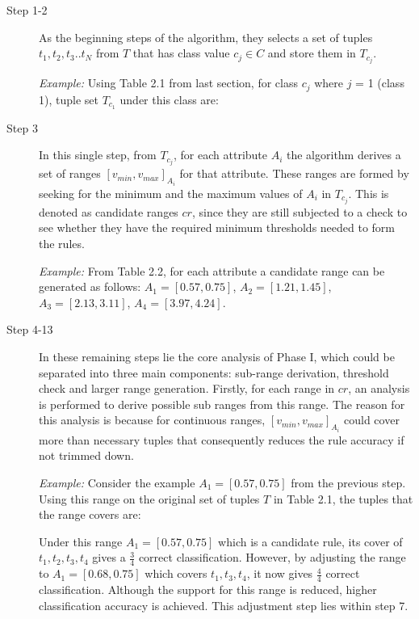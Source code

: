 \begin{description}
\item[Step 1-2] As the beginning steps of the algorithm, they selects a set of tuples $t_1, t_2, t_3..t_N$ from $T$ that has class value $c_j \in C$ and store them in $T_{c_j}$. 

\textit{Example: } Using Table 2.1 from last section, for class $c_j$ where $j$ = 1 (class 1), tuple set $T_{c_1}$ under this class are: 

 

\item[Step 3] In this single step, from $T_{c_j}$, for each attribute $A_i$ the algorithm derives a set of ranges $[v_{min}, v_{max}]_{A_i}$ for that attribute. These ranges are formed by seeking for the minimum and the maximum values of $A_i$ in $T_{c_j}$. This is denoted as candidate ranges $cr$, since they are still subjected to a check to see whether they have the required minimum thresholds needed to form the rules. 

\textit{Example: } From Table 2.2, for each attribute a candidate range can be generated as follows: 
$A_1 = [0.57, 0.75]$, 
$A_2 = [1.21, 1.45]$, 
$A_3 = [2.13, 3.11]$,
$A_4 = [3.97, 4.24]$.

\item[Step 4-13] In these remaining steps lie the core analysis of Phase I, which could be separated into three main components: sub-range derivation, threshold check and larger range generation. Firstly, for each range in $cr$, an analysis is performed to derive possible sub ranges from this range. The reason for this analysis is because for continuous ranges, $[v_{min}, v_{max}]_{A_i}$ could cover more than necessary tuples that consequently reduces the rule accuracy if not trimmed down.
 
\textit{Example: } Consider the example $A_1 = [0.57, 0.75]$ from the previous step. Using this range on the original set of tuples $T$ in Table 2.1, the tuples that the range covers are: 



Under this range $A_1 = [0.57, 0.75]$ which is a candidate rule, its cover of ${t_1,t_2,t_3,t_4}$ gives a $\frac{3}{4}$ correct classification. However, by adjusting the range to $A_1 = [0.68, 0.75]$ which covers ${t_1,t_3,t_4}$, it now gives $\frac{4}{4}$ correct classification. Although the support for this range is reduced, higher classification accuracy is achieved. This adjustment step lies within step 7. 


\end{description}
